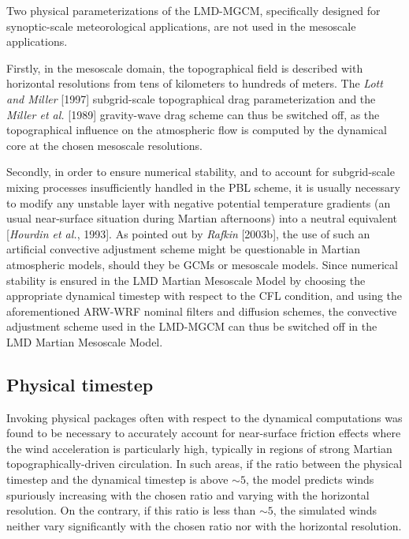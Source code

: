 \sk
Two physical parameterizations of the LMD-MGCM, specifically designed for synoptic-scale meteorological applications, are not used in the mesoscale applications.

\sk
Firstly, in the mesoscale domain, the topographical field is described with horizontal resolutions from tens of kilometers to hundreds of meters. The \textit{Lott and Miller} [1997]\nocite{Lott:97} subgrid-scale topographical drag parameterization and the \textit{Miller et al.} [1989]\nocite{Mill:89} gravity-wave drag scheme can thus be switched off, as the topographical influence on the atmospheric flow is computed by the dynamical core at the chosen mesoscale resolutions.

\sk
Secondly, in order to ensure numerical stability, and to account for subgrid-scale mixing processes insufficiently handled in the PBL scheme, it is usually necessary to modify any unstable layer with negative potential temperature gradients (an usual near-surface situation during Martian afternoons) into a neutral equivalent [\textit{Hourdin et al.}, 1993]. As pointed out by \textit{Rafkin} [2003b]\nocite{Rafk:03adj}, the use of such an artificial convective adjustment scheme might be questionable in Martian atmospheric models, should they be GCMs or mesoscale models. Since numerical stability is ensured in the LMD Martian Mesoscale Model by choosing the appropriate dynamical timestep with respect to the CFL condition, and using the aforementioned ARW-WRF nominal filters and diffusion schemes, the convective adjustment scheme used in the LMD-MGCM can thus be switched off in the LMD Martian Mesoscale Model. 

\mk
\subsection{Physical timestep}

\sk
Invoking physical packages often with respect to the dynamical computations was found to be necessary to accurately account for near-surface friction effects where the wind acceleration is particularly high, typically in regions of strong Martian topographically-driven circulation. In such areas, if the ratio between the physical timestep and the dynamical timestep is above $\sim 5$, the model predicts winds spuriously increasing with the chosen ratio and varying with the horizontal resolution. On the contrary, if this ratio is less than $\sim 5$, the simulated winds neither vary significantly with the chosen ratio nor with the horizontal resolution.

